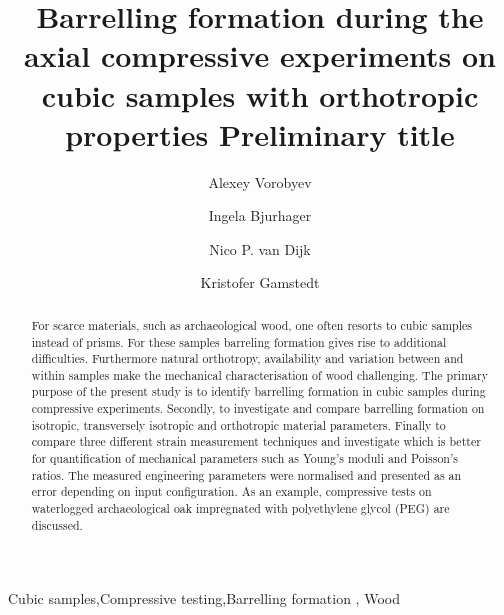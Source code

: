 \documentclass[review]{elsarticle}
\begin{document}
\begin{frontmatter}

\title{Barrelling formation during the axial compressive experiments on cubic
samples with orthotropic properties {\color{red} Preliminary title}}







\author{Alexey Vorobyev}


\author{Ingela Bjurhager}
\author{Nico P. van Dijk}
\author{Kristofer Gamstedt}

\address{Uppsala University, Division of Appplied Mechanics,
Uppsala, Sweden }



\begin{abstract}
For scarce materials, such as archaeological wood, one often resorts to cubic
samples instead of prisms. For these samples barreling formation gives rise to additional difficulties.
Furthermore natural orthotropy, availability and variation between and within
samples make the mechanical characterisation of wood  challenging. 
The primary purpose of the present study is to identify barrelling
formation in cubic samples during compressive experiments. Secondly, to investigate and
compare barrelling formation on isotropic, transversely 
isotropic and orthotropic material parameters. Finally to compare three 
different strain measurement techniques and investigate which is better for quantification 
of mechanical parameters such as Young's moduli and Poisson's ratios.
The measured engineering parameters were normalised and presented as an error
depending on input configuration.
As an example, compressive tests on waterlogged archaeological oak impregnated
with polyethylene glycol (PEG) are discussed.

\end{abstract}

\begin{keyword}
Cubic samples\sep Compressive testing\sep Barrelling formation \sep
Wood
\end{keyword}

\end{frontmatter}
\end{document}
